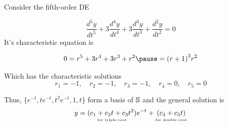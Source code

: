 \documentclass{beamer}
\begin{document}
\begin{frame}
\begin{example}
Consider the fifth-order DE

\vspace{-1mm}
\begin{equation*}
\dfrac{d^5y}{dt^5}
+3\dfrac{d^4y}{dt^4}
+3\dfrac{d^3y}{dt^3}
+\dfrac{d^2y}{dt^2}
=0
\end{equation*}\pause
It's characteristic equation is

\vspace{-1mm}
\begin{equation*}
\begin{aligned}
0=r^5+3r^4+3r^3+r^2\pause
={(r+1)}^3r^2
\end{aligned}
\end{equation*}\pause

\vspace{-3mm}
Which has the characteristic solutions
\begin{equation*}
r_1=-1,\quad
r_2=-1,\quad
r_3=-1,\quad
r_4=0,\quad
r_5=0
\end{equation*}\pause

\vspace{-3mm}
Thus, $\{e^{-t},te^{-t},t^2e^{-t},1,t\}$ form a basis of $\mathbb{S}$ and the general solution is
\begin{equation*}
y=\underset{\text{\tiny for triple root}}{(c_1+c_2t+c_3t^2)}e^{-t}
 +\underset{\text{\tiny for double root}}{(c_4+c_5t)}
\end{equation*}
\end{example}
\end{frame}
\end{document}
